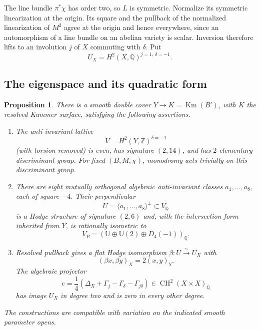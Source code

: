 \documentclass[11pt]{amsart}
\newcommand{\Q}{\mathbb Q}
\newcommand{\Z}{\mathbb Z}
\DeclareMathOperator{\CH}{CH}
\DeclareMathOperator{\Km}{Km}
\newtheorem{proposition}[theorem]{Proposition}
\theoremstyle{definition}
\theoremstyle{remark}
\numberwithin{equation}{section}
\begin{document}
The line bundle $\pi^*\chi$ has order two, so $L$ is symmetric.
Normalize its symmetric linearization at the origin.  Its square and
the pullback of the normalized linearization of $M^2$ agree at the
origin and hence everywhere, since an automorphism of a line bundle
on an abelian variety is scalar.  Inversion therefore lifts to an
involution $j$ of $X$ commuting with $\delta$.  Put
\[
 U_X=H^2(X,\Q)^{j=1,\,\delta=-1}.
\]

\subsection{The eigenspace and its quadratic form}

\begin{proposition}\label{geom:structure}
There is a smooth double cover $Y\to K=\Km(B')$, with $K$ the resolved
Kummer surface, satisfying the following assertions.
\begin{enumerate}[label=\textup{(\roman*)}]
\item The anti-invariant lattice
\[
 V=H^2(Y,\Z)^{\delta=-1}
\]
(with torsion removed) is even, has signature $(2,14)$, and has
$2$-elementary discriminant group.  For fixed $(B,M,\chi)$, monodromy
acts trivially on this discriminant group.
\item There are eight mutually orthogonal algebraic anti-invariant
classes $a_1,\ldots,a_8$, each of square $-4$.  Their perpendicular
\[
 U=\langle a_1,\ldots,a_8\rangle^\perp\subset V_\Q
\]
is a Hodge structure of signature $(2,6)$ and, with the intersection
form inherited from $Y$, is rationally isometric to
\[
 V_P=(\mathbb U\oplus\mathbb U(2)\oplus D_4(-1))_\Q.
\]
\item Resolved pullback gives a flat Hodge isomorphism
$\beta:U\xrightarrow{\sim}U_X$ with
\[
 (\beta x,\beta y)_X=2(x,y)_Y.
\]
The algebraic projector
\begin{equation}\label{geom:projector}
 e=\frac14(\Delta_X+\Gamma_j-\Gamma_\delta-\Gamma_{j\delta})
       \in\CH^2(X\times X)_\Q
\end{equation}
has image $U_X$ in degree two and is zero in every other degree.
\end{enumerate}
The constructions are compatible with variation on the indicated
smooth parameter opens.
\end{proposition}
\end{document}
